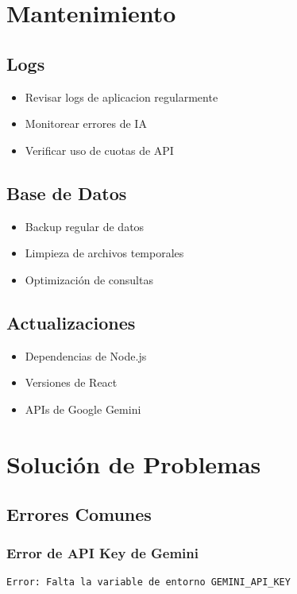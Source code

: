 \documentclass[12pt,a4paper]{report}
\begin{document}
\chapter{Mantenimiento}

\section{Logs}
\begin{itemize}
    \item Revisar logs de aplicacion regularmente
    \item Monitorear errores de IA
    \item Verificar uso de cuotas de API
\end{itemize}

\section{Base de Datos}
\begin{itemize}
    \item Backup regular de datos
    \item Limpieza de archivos temporales
    \item Optimización de consultas
\end{itemize}

\section{Actualizaciones}
\begin{itemize}
    \item Dependencias de Node.js
    \item Versiones de React
    \item APIs de Google Gemini
\end{itemize}

\chapter{Solución de Problemas}

\section{Errores Comunes}

\subsection{Error de API Key de Gemini}
\begin{lstlisting}
Error: Falta la variable de entorno GEMINI_API_KEY
\end{lstlisting}
\end{document}
